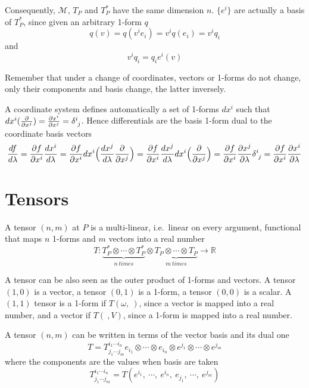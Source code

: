     Consequently, $\mathcal M$, $T_P$ and $T^*_P$ have the same dimension $n$. $\{e^i\}$ are actually a basis of $T^*_P$, since given an arbitrary 1-form $q$
    \begin{equation*}
        q(v) = q(v^i e_i) = v^i q(e_i) = v^i q_i
    \end{equation*}
    and
    \begin{equation*}
        v^i q_i = q_i e^i(v)
    \end{equation*}

    Remember that under a change of coordinates, vectors or 1-forms do not change, only their components and basis change, the latter inversely.

    A coordinate system defines automatically a set of 1-forms $dx^i$ such that $dx^i (\pdv{}{x^j}) = \pdv{x^i}{x^j} = \delta^i_{\phantom i j}$. Hence differentials are the basis 1-form dual to the coordinate basis vectors 
    \begin{equation*}
        \dv{f}{\lambda} = \pdv{f}{x^i} \dv{x^i}{\lambda} = \pdv{f}{x^i} dx^i \Big(\dv{x^j}{\lambda} \pdv{}{x^j} \Big) = \pdv{f}{x^i} \dv{x^j}{\lambda} dx^i \Big ( \pdv{}{x^j} \Big) = \pdv{f}{x^i} \pdv{x^j}{\lambda} \delta^i_{\phantom i j} = \pdv{f}{x^i} \pdv{x^i}{\lambda}
    \end{equation*}    

\section{Tensors}  

    \begin{definition}[Tensor]
        A tensor $(n, m)$ at $P$ is a multi-linear, i.e.~linear on every argument, functional that maps $n$ 1-forms and $m$ vectors into a real number 
        \begin{equation*}
            T \colon \underbrace{T^*_P \otimes \cdots \otimes T^*_P}_{n~times} \otimes \underbrace{T_P \otimes \cdots \otimes T_P}_{m~times} \rightarrow \mathbb R
        \end{equation*}
    \end{definition}

    A tensor can be also seen as the outer product of 1-forms and vectors. A tensor $(1, 0)$ is a vector, a tensor $(0, 1)$ is a 1-form, a tensor $(0,0)$ is a scalar. A $(1,1)$ tensor is a 1-form if $T(\omega, ~)$, since a vector is mapped into a real number, and a vector if $T(~, V)$, since a 1-form is mapped into a real number.
    
    A tensor $(n, m)$ can be written in terms of the vector basis and its dual one
    \begin{equation*}
        T = T^{i_1 \cdots i_n}_{j_1 \cdots j_m} e_{i_1} \otimes \cdots \otimes e_{i_n} \otimes e^{j_1} \otimes \cdots \otimes e^{j_m}
    \end{equation*}
    where the components are the values when basis are taken
    \begin{equation*}
        T^{i_1 \cdots i_n}_{j_1 \cdots j_m} = T(e^{i_1}, ~\cdots, ~e^{i_n}, ~e_{j_1}, ~\cdots, ~e^{j_m})
    \end{equation*}

